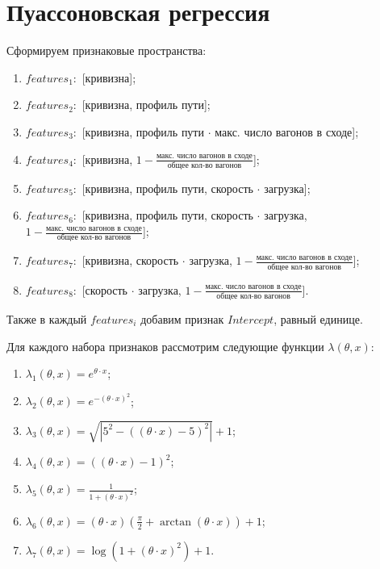 \section{Пуассоновская регрессия}

Сформируем признаковые пространства:
\begin{enumerate}[label=\arabic*.]
    \item $features_1:$ [кривизна];
    \item $features_2:$ [кривизна, профиль пути];
    \item $features_3:$ [кривизна, профиль пути $\cdot$ макс. число вагонов в сходе];
    \item $features_4:$ [кривизна, $1 - \frac{\text{макс. число вагонов в сходе}}{\text{общее кол-во вагонов}}$];
    \item $features_5:$ [кривизна, профиль пути, скорость $\cdot$ загрузка];
    \item $features_6:$ [кривизна, профиль пути, скорость $\cdot$ загрузка,\\ $1 - \frac{\text{макс. число вагонов в сходе}}{\text{общее кол-во вагонов}}$];
    \item $features_7:$ [кривизна, скорость $\cdot$ загрузка, $1 - \frac{\text{макс. число вагонов в сходе}}{\text{общее кол-во вагонов}}$];
    \item $features_8:$ [скорость $\cdot$ загрузка, $1 - \frac{\text{макс. число вагонов в сходе}}{\text{общее кол-во вагонов}}$].
    \newline
\end{enumerate}
Также в каждый $features_i$ добавим признак $Intercept$, равный единице.

Для каждого набора признаков рассмотрим следующие функции $\lambda(\theta, x)$:
\begin{enumerate}[label=\arabic*.]
    \item $\lambda_1(\theta, x) = e^{\theta \cdot x}$;
    \item $\lambda_2(\theta, x) = e^{-(\theta \cdot x)^2}$;
    \item $\lambda_3(\theta, x) = \sqrt{|5^2 - ((\theta \cdot x) - 5)^2|} + 1$;
    \item $\lambda_4(\theta, x) = ((\theta \cdot x) - 1)^2$;
    \item $\lambda_5(\theta, x) = \frac{1}{1 + (\theta \cdot x)^2}$;
    \item $\lambda_6(\theta, x) = (\theta \cdot x) (\frac{\pi}{2} + \arctan(\theta \cdot x)) + 1$;
    \item $\lambda_7(\theta, x) = \log(1 + (\theta \cdot x)^2) + 1$.
\end{enumerate}

